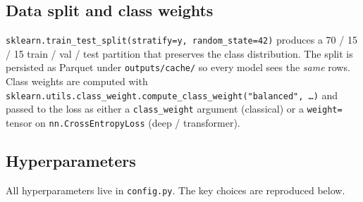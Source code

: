 \documentclass[
  english,
  11pt,
]{article}
\begin{document}
\subsection{Data split and class
weights}\label{data-split-and-class-weights}

\texttt{sklearn.train\_test\_split(stratify=y,\ random\_state=42)}
produces a 70 / 15 / 15 train / val / test partition that preserves the
class distribution. The split is persisted as Parquet under
\texttt{outputs/cache/} so every model sees the \emph{same} rows. Class
weights are computed with
\texttt{sklearn.utils.class\_weight.compute\_class\_weight("balanced",\ …)}
and passed to the loss as either a \texttt{class\_weight} argument
(classical) or a \texttt{weight=} tensor on \texttt{nn.CrossEntropyLoss}
(deep / transformer).

\subsection{Hyperparameters}\label{hyperparameters}

All hyperparameters live in \texttt{config.py}. The key choices are
reproduced below.
\end{document}
